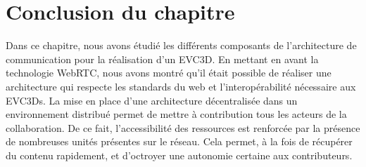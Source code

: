 






\section{Conclusion du chapitre}
Dans ce chapitre, nous avons étudié les différents composants de l'architecture de 
communication pour la réalisation d'un \gls{EVC3D}. En mettant en avant la 
technologie WebRTC, nous avons montré qu'il était possible de réaliser une 
architecture qui respecte les standards du web et l'interopérabilité nécessaire aux \glspl{EVC3D}. La mise en place d'une architecture décentralisée dans un 
environnement distribué permet de mettre à contribution tous les acteurs de la 
collaboration. De ce fait, l'accessibilité des ressources est renforcée par la 
présence de nombreuses unités présentes sur le réseau. Cela permet, à la fois 
de récupérer du contenu rapidement, et d'octroyer une autonomie certaine aux 
contributeurs. 
